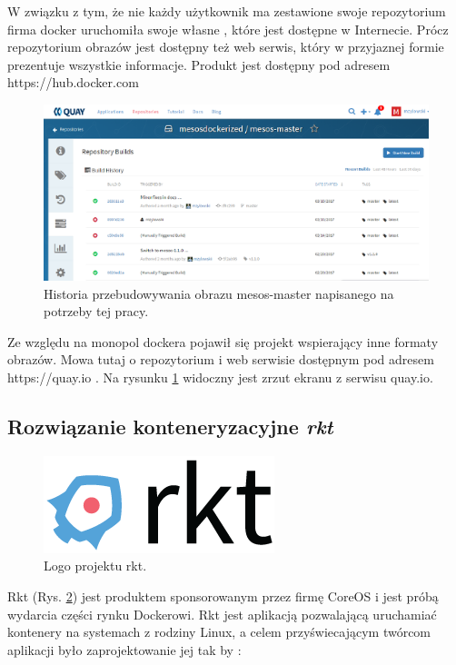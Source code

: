 \documentclass[10pt,a4paper,titlepage,twoside]{report}
\begin{document}
W związku z tym, że nie każdy użytkownik ma zestawione swoje repozytorium firma docker uruchomiła swoje własne \cite{ad28}, które jest dostępne w Internecie. Prócz repozytorium obrazów jest dostępny też web serwis, który w przyjaznej formie prezentuje wszystkie informacje. Produkt jest dostępny pod adresem https://hub.docker.com

\begin{figure}[!h]
	\centering
	\includegraphics[scale=1]{pics/quay.png}
	\caption{Historia przebudowywania obrazu mesos-master napisanego na potrzeby tej pracy.}
	\label{quay_io}
\end{figure}

Ze względu na monopol dockera pojawił się projekt wspierający inne formaty obrazów. Mowa tutaj o repozytorium i web serwisie dostępnym pod adresem https://quay.io \cite{ad28}. Na rysunku \ref{quay_io} widoczny jest zrzut ekranu z serwisu quay.io.

\subsection{Rozwiązanie konteneryzacyjne \textit{rkt}}

\begin{figure}[!h]
	\centering
	\includegraphics[scale=1]{pics/rkt-horizontal-color.png}
	\caption{Logo projektu rkt.}
	\label{rkt_logo}
\end{figure}

Rkt \cite{ad29}(Rys. \ref{rkt_logo}) jest produktem sponsorowanym przez firmę CoreOS i jest próbą wydarcia części rynku Dockerowi. Rkt jest aplikacją pozwalającą uruchamiać kontenery na systemach z rodziny Linux, a celem przyświecającym twórcom aplikacji było zaprojektowanie jej tak by \cite{ad29}:
\end{document}
